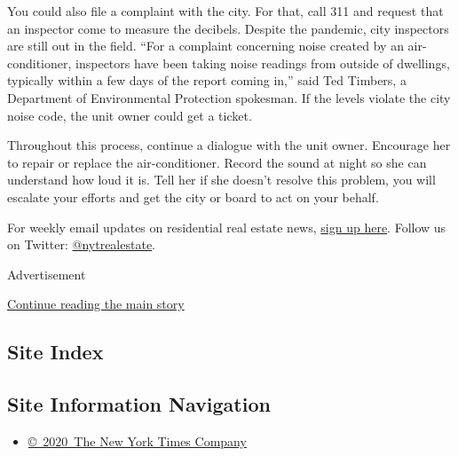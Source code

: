You could also file a complaint with the city. For that, call 311 and
request that an inspector come to measure the decibels. Despite the
pandemic, city inspectors are still out in the field. ``For a complaint
concerning noise created by an air-conditioner, inspectors have been
taking noise readings from outside of dwellings, typically within a few
days of the report coming in,'' said Ted Timbers, a Department of
Environmental Protection spokesman. If the levels violate the city noise
code, the unit owner could get a ticket.

Throughout this process, continue a dialogue with the unit owner.
Encourage her to repair or replace the air-conditioner. Record the sound
at night so she can understand how loud it is. Tell her if she doesn't
resolve this problem, you will escalate your efforts and get the city or
board to act on your behalf.

For weekly email updates on residential real estate news,
\href{http://www.nytimes.com/newsletters/realestate/}{sign up here}.
Follow us on Twitter:
\href{https://twitter.com/nytrealestate}{@nytrealestate}.

Advertisement

\protect\hyperlink{after-bottom}{Continue reading the main story}

\hypertarget{site-index}{%
\subsection{Site Index}\label{site-index}}

\hypertarget{site-information-navigation}{%
\subsection{Site Information
Navigation}\label{site-information-navigation}}

\begin{itemize}
\tightlist
\item
  \href{https://help.nytimes.com/hc/en-us/articles/115014792127-Copyright-notice}{©~2020~The
  New York Times Company}
\end{itemize}

